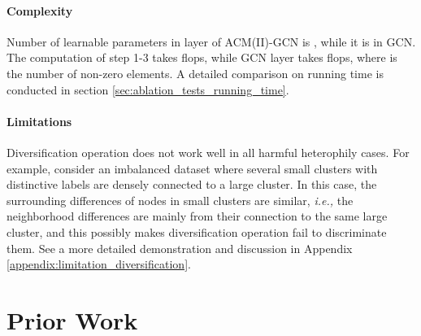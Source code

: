 \documentclass{article}
\newcommand\ie{\textit{i.e.,}}
\newcommand{\0}{{\boldsymbol{0}}}
\newcommand{\6}{{\partial}}
\newcommand{\8}{{\infty}}
\newcommand{\4}{{\nabla}}
\begin{document}
\paragraph{Complexity} Number of learnable parameters in layer  of ACM(II)-GCN is , while it is  in GCN. The computation of step 1-3 takes  flops, while GCN layer takes  flops, where  is the number of non-zero elements. A detailed comparison on running time is conducted in section \ref{sec:ablation_tests_running_time}.
\vspace*{-2.5mm}
\paragraph{Limitations} Diversification operation does not work well in all harmful heterophily cases. For example, consider an imbalanced dataset where several small clusters with distinctive labels are densely connected to a large cluster. In this case, the surrounding differences of nodes in small clusters are similar, \ie{} the neighborhood differences are mainly from their connection to the same large cluster, and this possibly makes diversification operation fail to discriminate them. See a more detailed demonstration and discussion in Appendix \ref{appendix:limitation_diversification}.




\vspace*{-2.5mm}
\section{Prior Work}
\label{sec:related_works}
\end{document}
